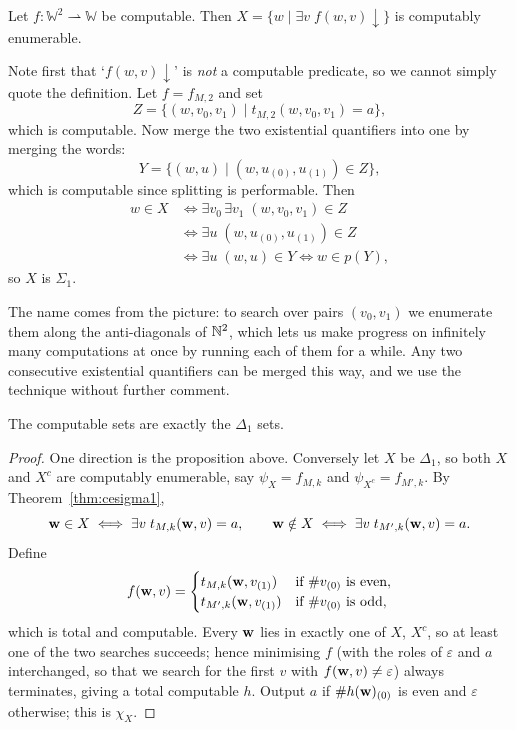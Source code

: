 \documentclass[a4paper]{scrartcl}
\newcommand{\WW}{\mathbb{W}}
\newcommand{\eps}{\varepsilon}
\begin{document}
\begin{example}\label{ex:zigzag}
	Let $f \colon \WW^2 \rightharpoonup \WW$ be computable. Then $X = \{w \mid \exists v\; f(w,v)\!\downarrow\}$ is computably enumerable.

	Note first that `$f(w,v)\!\downarrow$' is \emph{not} a computable predicate, so we cannot simply quote the definition. Let $f = f_{M,2}$ and set
	$$Z = \{(w,v_0,v_1) \mid t_{M,2}(w,v_0,v_1) = a\},$$
	which is computable. Now merge the two existential quantifiers into one by merging the words:
	$$Y = \{(w,u) \mid (w, u_{(0)}, u_{(1)}) \in Z\},$$
	which is computable since splitting is performable. Then
	\begin{align*}
		w \in X &\iff \exists v_0\, \exists v_1\; (w,v_0,v_1) \in Z \\
		&\iff \exists u\; (w, u_{(0)}, u_{(1)}) \in Z \\
		&\iff \exists u\; (w,u) \in Y \iff w \in p(Y),
	\end{align*}
	so $X$ is $\Sigma_1$.
\end{example}

The name comes from the picture: to search over pairs $(v_0,v_1)$ we enumerate them along the anti-diagonals of $\mathbb{N}^2$, which lets us make progress on infinitely many computations at once by running each of them for a while. Any two consecutive existential quantifiers can be merged this way, and we use the technique without further comment.

\begin{corollary}\label{cor:computabledelta1}
	The computable sets are exactly the $\Delta_1$ sets.
\end{corollary}

\begin{proof}
	One direction is the proposition above. Conversely let $X$ be $\Delta_1$, so both $X$ and $X^c$ are computably enumerable, say $\psi_X = f_{M,k}$ and $\psi_{X^c} = f_{M',k}$. By Theorem~\ref{thm:cesigma1},
	$$\mathbf{w} \in X \iff \exists v\; t_{M,k}(\mathbf{w}, v) = a, \qquad \mathbf{w} \notin X \iff \exists v\; t_{M',k}(\mathbf{w}, v) = a.$$
	Define
	$$f(\mathbf{w}, v) = \begin{cases} t_{M,k}(\mathbf{w}, v_{(1)}) & \text{if } \#v_{(0)} \text{ is even}, \\ t_{M',k}(\mathbf{w}, v_{(1)}) & \text{if } \#v_{(0)} \text{ is odd},\end{cases}$$
	which is total and computable. Every $\mathbf{w}$ lies in exactly one of $X$, $X^c$, so at least one of the two searches succeeds; hence minimising $f$ (with the roles of $\eps$ and $a$ interchanged, so that we search for the first $v$ with $f(\vv w, v) \neq \eps$) always terminates, giving a total computable $h$. Output $a$ if $\#h(\mathbf{w})_{(0)}$ is even and $\eps$ otherwise; this is $\chi_X$.
\end{proof}
\end{document}
